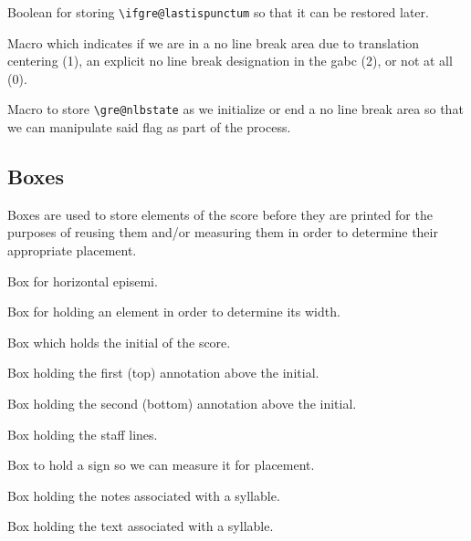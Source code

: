 Boolean for storing \verb=\ifgre@lastispunctum= so that it can be restored later.

Macro which indicates if we are in a no line break area due to translation centering (1), an explicit no line break designation in the gabc (2), or not at all (0).

Macro to store \verb=\gre@nlbstate= as we initialize or end a no line break area so that we can manipulate said flag as part of the process.


\subsection{Boxes}

Boxes are used to store elements of the score before they are printed for the purposes of reusing them and/or measuring them in order to determine their appropriate placement.

Box for horizontal episemi.

Box for holding an element in order to determine its width.

Box which holds the initial of the score.

Box holding the first (top) annotation above the initial.

Box holding the second (bottom) annotation above the initial.

Box holding the staff lines.

Box to hold a sign so we can measure it for placement.

Box holding the notes associated with a syllable.

Box holding the text associated with a syllable.



